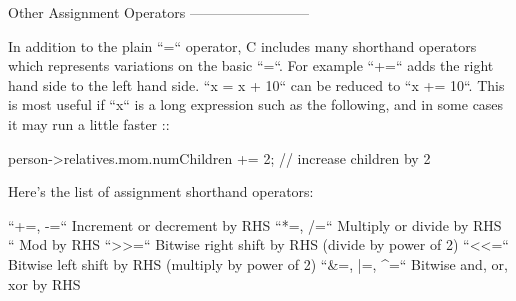 Other Assignment Operators
--------------------------

In addition to the plain ``=`` operator, C includes many shorthand operators which represents variations on the basic ``=``. For example ``+=`` adds the right hand side to the left hand side. ``x = x + 10`` can be reduced to ``x += 10``. This is most useful if ``x`` is a long expression such as the following, and in some cases it may run a little faster ::

   person->relatives.mom.numChildren += 2;      // increase children by 2

Here's the list of assignment shorthand operators:

``+=, -=``
    Increment or decrement by RHS
``*=, /=``
    Multiply or divide by RHS
``%
    Mod by RHS
``>>=``
    Bitwise right shift by RHS (divide by power of 2)
``<<=``
    Bitwise left shift by RHS (multiply by power of 2)
``&=, |=, ^=``
    Bitwise and, or, xor by RHS



